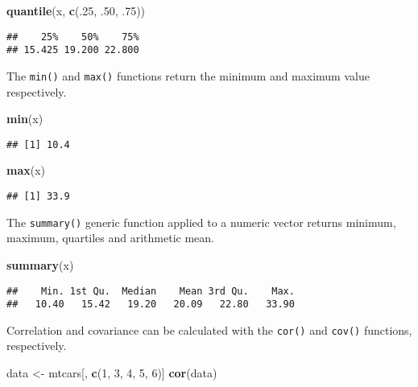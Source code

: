 \documentclass[]{book}
\newenvironment{Shaded}{\begin{snugshade}}{\end{snugshade}}
\newcommand{\KeywordTok}[1]{\textcolor[rgb]{0.13,0.29,0.53}{\textbf{{#1}}}}
\newcommand{\DecValTok}[1]{\textcolor[rgb]{0.00,0.00,0.81}{{#1}}}
\newcommand{\StringTok}[1]{\textcolor[rgb]{0.31,0.60,0.02}{{#1}}}
\newcommand{\NormalTok}[1]{{#1}}
\begin{document}
\begin{Shaded}
\begin{Highlighting}[]
\KeywordTok{quantile}\NormalTok{(x, }\KeywordTok{c}\NormalTok{(.}\DecValTok{25}\NormalTok{, .}\DecValTok{50}\NormalTok{, .}\DecValTok{75}\NormalTok{))}
\end{Highlighting}
\end{Shaded}

\begin{verbatim}
##    25%    50%    75% 
## 15.425 19.200 22.800
\end{verbatim}

The \texttt{min()} and \texttt{max()} functions return the minimum and
maximum value respectively.

\begin{Shaded}
\begin{Highlighting}[]
\KeywordTok{min}\NormalTok{(x)}
\end{Highlighting}
\end{Shaded}

\begin{verbatim}
## [1] 10.4
\end{verbatim}

\begin{Shaded}
\begin{Highlighting}[]
\KeywordTok{max}\NormalTok{(x)}
\end{Highlighting}
\end{Shaded}

\begin{verbatim}
## [1] 33.9
\end{verbatim}

The \texttt{summary()} generic function applied to a numeric vector
returns minimum, maximum, quartiles and arithmetic mean.

\begin{Shaded}
\begin{Highlighting}[]
\KeywordTok{summary}\NormalTok{(x)}
\end{Highlighting}
\end{Shaded}

\begin{verbatim}
##    Min. 1st Qu.  Median    Mean 3rd Qu.    Max. 
##   10.40   15.42   19.20   20.09   22.80   33.90
\end{verbatim}

Correlation and covariance can be calculated with the \texttt{cor()} and
\texttt{cov()} functions, respectively.

\begin{Shaded}
\begin{Highlighting}[]
\NormalTok{data <-}\StringTok{ }\NormalTok{mtcars[, }\KeywordTok{c}\NormalTok{(}\DecValTok{1}\NormalTok{, }\DecValTok{3}\NormalTok{, }\DecValTok{4}\NormalTok{, }\DecValTok{5}\NormalTok{, }\DecValTok{6}\NormalTok{)]}
\KeywordTok{cor}\NormalTok{(data)}
\end{Highlighting}
\end{Shaded}
\end{document}
